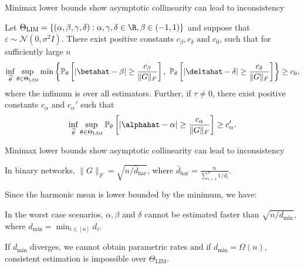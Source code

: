 \documentclass[aspectratio=169]{beamer}
\theoremstyle{remark}
\begin{document}
\begin{frame}{Minimax lower bounds show asymptotic collinearity can lead to inconsistency}
    
    \begin{theorem}
        Let $\Theta_\mathrm{LIM}= \left\{ (\alpha,\beta,\gamma,\delta) : \alpha,\gamma,\delta \in \R, \beta \in (-1,1) \right\}$ and suppose that $\varepsilon \sim \mathcal N(0, \sigma^2 I)$. There exist positive constants $c_\beta,c_\delta$ and $c_0$, such that for sufficiently large $n$
        \begin{equation*} \label{eq:minimax:betadelta}
            \inf_{\widehat{\theta}} \sup_{\theta \in \Theta_\mathrm{LIM}}
            \min\left\{
            \mathbb{P}_{\theta}\left[
                \left| \betahat - \beta \right| \ge \frac{c_\beta}{\| G \|_F} \right] ,
            ~
            \mathbb{P}_{\theta}\left[
                \left| \deltahat - \delta \right| \ge \frac{c_\delta}{\| G \|_F} \right]
            \right\} 
            \ge c_0 ,
        \end{equation*}
        where the infimum is over all estimators. Further, if $\tau \neq 0$, there exist positive constants $c_\alpha$ and $c_\alpha'$ such that
        \begin{equation*}
            \inf_{\widehat{\theta}} \sup_{\theta \in \Theta_\mathrm{LIM}}
            \mathbb{P}_{\theta}\left[
                \left| \alphahat - \alpha \right| \ge \frac{c_\alpha}{\| G \|_F} \right]
            \ge c_\alpha' .
        \end{equation*}
    \end{theorem}
\end{frame}


\begin{frame}{Minimax lower bounds show asymptotic collinearity can lead to inconsistency}
    
    In binary networks, $\| G \|_F = \sqrt{n/\bar{d}_{\text{har}}}$, where $\displaystyle \bar{d}_{\text{har}} = \frac{n}{\sum_{i=1}^n 1/d_i}$.
    
    \vspace{4mm}
    
    Since the harmonic mean is lower bounded by the minimum, we have:
    
    \vspace{2mm}
    
    \begin{theorem}[Intuitive]
        In the worst case scenarios, $\alpha, \beta$ and $\delta$ cannot be estimated faster than $\sqrt{n / d_{\min}}$, where $d_{\min} = \min_{i \in [n]} d_i$.
    \end{theorem}
    
    \vspace{2mm}
    
    If $d_{\min}$ diverges, we cannot obtain parametric rates and if $d_{\min} = \Omega(n)$, consistent estimation is impossible over $\Theta_\mathrm{LIM}$.
    
\end{frame}
\end{document}
